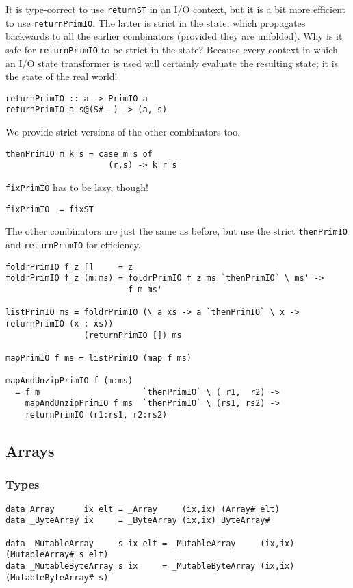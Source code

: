 It is type-correct to use \mbox{\tt returnST} in an I/O context, but it is a
bit more efficient to use \mbox{\tt returnPrimIO}.  The latter is strict in the
state, which propagates backwards to all the earlier combinators
(provided they are unfolded).  Why is it safe for \mbox{\tt returnPrimIO} to be
strict in the state?  Because every context in which an I/O state
transformer is used will certainly evaluate the resulting state; it is
the state of the real world!
\begin{verbatim}
returnPrimIO :: a -> PrimIO a
returnPrimIO a s@(S# _) -> (a, s)
\end{verbatim}
We provide strict versions of the other combinators too.
\begin{verbatim}
thenPrimIO m k s = case m s of
                     (r,s) -> k r s
\end{verbatim}
\mbox{\tt fixPrimIO} has to be lazy, though!
\begin{verbatim}
fixPrimIO  = fixST
\end{verbatim}
The other combinators are just the same as before, but use the strict
\mbox{\tt thenPrimIO} and \mbox{\tt returnPrimIO} for efficiency.
\begin{verbatim}
foldrPrimIO f z []     = z
foldrPrimIO f z (m:ms) = foldrPrimIO f z ms `thenPrimIO` \ ms' ->
                         f m ms'

listPrimIO ms = foldrPrimIO (\ a xs -> a `thenPrimIO` \ x -> returnPrimIO (x : xs))
                (returnPrimIO []) ms

mapPrimIO f ms = listPrimIO (map f ms)

mapAndUnzipPrimIO f (m:ms)
  = f m                     `thenPrimIO` \ ( r1,  r2) ->
    mapAndUnzipPrimIO f ms  `thenPrimIO` \ (rs1, rs2) ->
    returnPrimIO (r1:rs1, r2:rs2)
\end{verbatim}

\subsection{Arrays}

\subsubsection{Types}

\begin{verbatim}
data Array      ix elt = _Array     (ix,ix) (Array# elt)
data _ByteArray ix     = _ByteArray (ix,ix) ByteArray#

data _MutableArray     s ix elt = _MutableArray     (ix,ix) (MutableArray# s elt)
data _MutableByteArray s ix     = _MutableByteArray (ix,ix) (MutableByteArray# s)
\end{verbatim}

